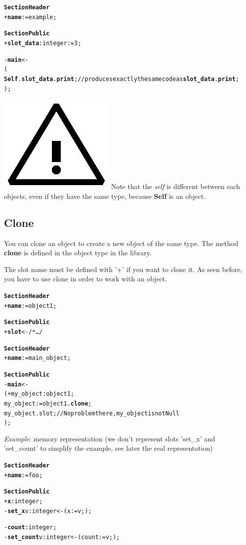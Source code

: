 \documentclass[11pt]{mybook}
\newcommand{\warning}{\includegraphics[scale=0.3]{figures/warning}}
\begin{document}
\begin{alltt} 
{\bf{}Section Header}
  + {\bf{}name}     := {\sc{}example};          

{\bf{}Section Public}
  + {\bf{}slot\_data}:{\sc{}integer} := 3;

  - {\bf{}main} <-
  ( 
     {\bf{}Self}.{\bf{}slot\_data}.{\bf{}print};    // produces exactly the same code as {\bf{}slot\_data}.{\bf{}print};
  );
\end{alltt}

\warning{} Note that the {\it{}self} is different between each objects, even if they have the same type, because {\bf{}Self} is an object.

\subsection{Clone}
\label{quickstart:oo_language:clone}
%
You can clone an object to create a new object of the same type.
The method {\bf{}clone} is defined in the {\sc{}object} type in the library.

The slot name must be defined with '+' if you want to clone it.
As seen before, you have to use clone in order to work with an object.

\begin{alltt} 
{\bf{}Section Header}
  + {\bf{}name}     := {\sc{}object1};          

{\bf{}Section Public}
   + {\bf{}slot} <- /* \ldots */
\end{alltt}

\begin{alltt} 
{\bf{}Section Header}
  + {\bf{}name}     := {\sc{}main\_object};          

{\bf{}Section Public}
  - {\bf{}main} <-
  ( + my\_object:{\sc{}object1};
    my\_object := {\sc{}object1}.{\bf{}clone};
    my\_object.slot;       // No problem there, my\_object is not Null
  );
\end{alltt}

{\it{}Example}: memory representation (we don't represent slots 'set\_x' and 'set\_count' to simplify the example, see later the real representation)
\begin{alltt} 
{\bf{}Section Header}
  + {\bf{}name}     := {\sc{}foo};          

{\bf{}Section Public}
  + {\bf{}x}    :{\sc{}integer};
  - {\bf{}set\_x} v:{\sc{}integer} <- ( x := v; );

  - {\bf{}count}:{\sc{}integer};
  - {\bf{}set\_count} v:{\sc{}integer} <- ( count := v; );
\end{alltt}
\end{document}

